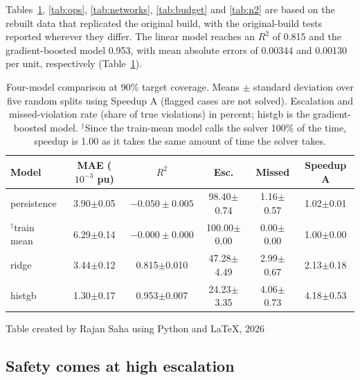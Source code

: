 \documentclass[12pt]{article}
\begin{document}
Tables~\ref{tab:models}, \ref{tab:ops}, \ref{tab:networks}, \ref{tab:budget} and \ref{tab:n2} are based on the rebuilt data that replicated the original build, with the original-build tests reported wherever they differ. The linear model reaches an $R^2$ of 0.815 and the gradient-boosted model 0.953, with mean absolute errors of 0.00344 and 0.00130 per unit, respectively (Table~\ref{tab:models}).

\begin{table}[htbp]
\centering

\caption{Four-model comparison at 90\% target coverage. Means $\pm$ standard deviation over five random splits using Speedup A (flagged cases are not solved). Escalation and missed-violation rate (share of true violations) in percent; histgb is the gradient-boosted model. $^{\dagger}$Since the train-mean model calls the solver 100\% of the time, speedup is 1.00 as it takes the same amount of time the solver takes.}
\label{tab:models}
\small
\begin{tabular}{lccccc}
\toprule
Model & MAE ($10^{-3}$ pu) & $R^2$ & Esc. & Missed & Speedup A \\
\midrule
persistence & 3.90$\pm$0.05 & $-0.050\pm0.005$ & 98.40$\pm$0.74 & 1.16$\pm$0.57 & 1.02$\pm$0.01 \\
$^{\dagger}$train mean  & 6.29$\pm$0.14 & $-0.000\pm0.000$ & 100.00$\pm$0.00 & 0.00$\pm$0.00 & 1.00$\pm$0.00 \\
ridge       & 3.44$\pm$0.12 & 0.815$\pm$0.010 & 47.28$\pm$4.49 & 2.99$\pm$0.67 & 2.13$\pm$0.18 \\
histgb      & 1.30$\pm$0.17 & 0.953$\pm$0.007 & 24.23$\pm$3.35 & 4.06$\pm$0.73 & 4.18$\pm$0.53 \\
\bottomrule
\end{tabular}

\vspace*{1ex}
{\small Table created by Rajan Saha using Python and \LaTeX, 2026}
\end{table}


\subsection{Safety comes at high escalation}
\end{document}
